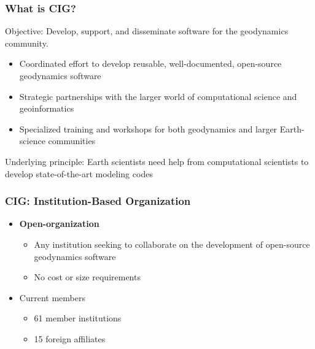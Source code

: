 \documentclass[aspectratio=169]{beamer}
\begin{document}
\begin{frame}
  \frametitle{What is CIG?}
 
  \vfill

  Objective: Develop, support, and disseminate software for the
  geodynamics community.

  \vfill

  \begin{itemize}
  \item Coordinated effort to develop reusable, well-documented,
    open-source geodynamics software
  \item Strategic partnerships with the larger world of
    computational science and geoinformatics
  \item Specialized training and workshops for both geodynamics and
    larger Earth-science communities
  \end{itemize}

  \vfill
 
  Underlying principle: Earth scientists need help from computational
  scientists to develop state-of-the-art modeling codes

\end{frame}


\begin{frame}
  \frametitle{CIG: Institution-Based Organization}
 
  \begin{itemize}
  \item {\bf Open-organization}
    \begin{itemize}
    \item Any institution seeking to collaborate on the development of
      open-source geodynamics software
    \item No cost or size requirements
    \end{itemize}
  \item Current members
    \begin{itemize}
    \item 61 member institutions
    \item 15 foreign affiliates
    \end{itemize}
 \end{itemize}
\end{frame}
\end{document}
